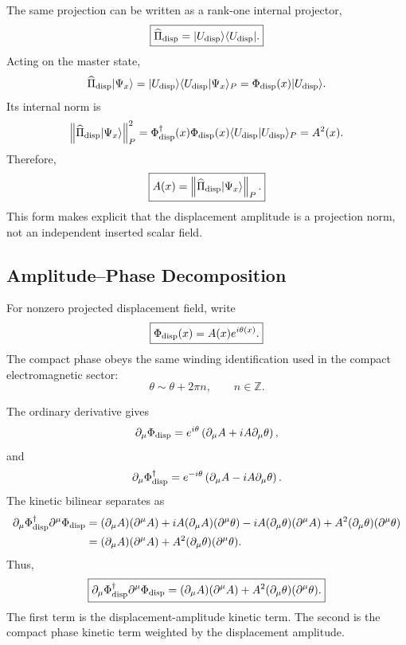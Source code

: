 \documentclass[11pt]{article}
\begin{document}
The same projection can be written as a rank-one internal projector,
\begin{equation}
\boxed{
\widehat{\Pi}_{\rm disp}
=
|U_{\rm disp}\rangle\langle U_{\rm disp}|.
}
\end{equation}
Acting on the master state,
\begin{equation}
\widehat{\Pi}_{\rm disp}|\Psi_x\rangle
=
|U_{\rm disp}\rangle
\langle U_{\rm disp}|\Psi_x\rangle_P
=
\Phi_{\rm disp}(x)|U_{\rm disp}\rangle .
\end{equation}
Its internal norm is
\begin{equation}
\left\|
\widehat{\Pi}_{\rm disp}|\Psi_x\rangle
\right\|_P^2
=
\Phi_{\rm disp}^{\dagger}(x)\Phi_{\rm disp}(x)
\langle U_{\rm disp}|U_{\rm disp}\rangle_P
=
A^2(x).
\end{equation}
Therefore,
\begin{equation}
\boxed{
A(x)
=
\left\|
\widehat{\Pi}_{\rm disp}|\Psi_x\rangle
\right\|_P.
}
\end{equation}
This form makes explicit that the displacement amplitude is a projection norm,
not an independent inserted scalar field.

\subsection{Amplitude--Phase Decomposition}

For nonzero projected displacement field, write
\begin{equation}
\boxed{
\Phi_{\rm disp}(x)
=
A(x)e^{i\theta(x)}.
}
\end{equation}
The compact phase obeys the same winding identification used in the compact
electromagnetic sector:
\begin{equation}
\boxed{
\theta\sim\theta+2\pi n,
\qquad
n\in\mathbb Z.
}
\end{equation}

The ordinary derivative gives
\begin{equation}
\partial_\mu\Phi_{\rm disp}
=
e^{i\theta}
\left(
\partial_\mu A
+
iA\partial_\mu\theta
\right),
\end{equation}
and
\begin{equation}
\partial_\mu\Phi_{\rm disp}^{\dagger}
=
e^{-i\theta}
\left(
\partial_\mu A
-
iA\partial_\mu\theta
\right).
\end{equation}
The kinetic bilinear separates as
\begin{align}
\partial_\mu\Phi_{\rm disp}^{\dagger}
\partial^\mu\Phi_{\rm disp}
&=
(\partial_\mu A)(\partial^\mu A)
+
iA(\partial_\mu A)(\partial^\mu\theta)
-
iA(\partial_\mu\theta)(\partial^\mu A)
+
A^2(\partial_\mu\theta)(\partial^\mu\theta)
\\
&=
(\partial_\mu A)(\partial^\mu A)
+
A^2(\partial_\mu\theta)(\partial^\mu\theta).
\end{align}
Thus,
\begin{equation}
\boxed{
\partial_\mu\Phi_{\rm disp}^{\dagger}
\partial^\mu\Phi_{\rm disp}
=
(\partial_\mu A)(\partial^\mu A)
+
A^2(\partial_\mu\theta)(\partial^\mu\theta).
}
\end{equation}
The first term is the displacement-amplitude kinetic term. The second is the
compact phase kinetic term weighted by the displacement amplitude.
\end{document}
